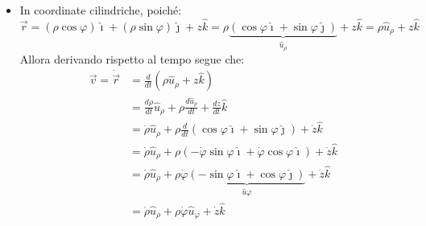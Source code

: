 \documentclass[11pt, a4paper, openright]{book}
\theoremstyle{plain}
\theoremstyle{definition}
\begin{document}
\begin{itemize}
\begin{itemize}
        \item Derivando la componente $\hat{\imath}$:
        \begin{align}
            \frac{d}{dt}(r\sin\theta\cos\varphi) = \dot{r}\sin\theta\cos\varphi + r\dot{\theta}\cos\theta\cos\varphi - r\dot{\varphi}\sin\theta\sin\varphi
        \end{align}
        \item Derivando la componente $\hat{\jmath}$:
        \begin{align}
            \frac{d}{dt}(r\sin\theta\sin\varphi) = \dot{r}\sin\theta\sin\varphi + r\dot{\theta}\cos\theta\sin\varphi + r\dot{\varphi}\sin\theta\cos\varphi
        \end{align}
        \item Derivando la componente $\hat{k}$:
        \begin{align}
            \frac{d}{dt}(r\cos\theta) = \dot{r}\cos\theta - r\dot{\theta}\sin\theta
        \end{align}
    \end{itemize}
    Raccogliendo per le componenti segue che:
    \begin{align}
        \vec{v} & = \dot{r}(\sin\theta\cos\varphi + \sin\theta\sin\varphi + \cos\theta ) + \dot{\theta}(r\cos\theta\cos\varphi + r\cos\theta\sin\varphi - r\sin\theta) + \\
        &\quad \; + \dot{\varphi}(-r\sin\theta\sin\varphi + r\sin\theta\cos\varphi) \\
        & = \dot{r}\hat{u}_r + r\dot{\theta}\hat{u}_\theta + \dot{\varphi}(r\sin\theta)\hat{u}_\varphi
    \end{align}
    \item In coordinate cilindriche, poiché:
    \[
    \vec{r} = (\rho\cos\varphi)\hat{\imath} + (\rho\sin\varphi)\hat{\jmath} + z\hat{k} = \rho\underbrace{(\cos\varphi\hat{\imath} + \sin\varphi\hat{\jmath})}_{\hat{u}_\rho} + z\hat{k} = \rho\hat{u}_\rho + z\hat{k}
    \]
    Allora derivando rispetto al tempo segue che:
    \begin{align}
    \vec{v} = \dot{\vec{r}} & = \frac{d}{dt}(\rho\hat{u}_\rho + z\hat{k}) \\
    & = \frac{d\rho}{dt}\hat{u}_\rho + \rho\frac{d\hat{u}_\rho}{dt} + \frac{dz}{dt}\hat{k} \\
    & = \dot{\rho}\hat{u}_\rho + \rho\frac{d}{dt}(\cos\varphi \hat{\imath} + \sin\varphi \hat{\jmath}) + \dot{z}\hat{k} \\
    & = \dot{\rho}\hat{u}_\rho + \rho(-\dot{\varphi}\sin\varphi\hat{\imath} + \dot{\varphi}\cos\varphi\hat{\imath}) + \dot{z}\hat{k} \\
    & = \dot{\rho}\hat{u}_\rho + \rho\dot{\varphi}\underbrace{(-\sin\varphi\hat{\imath} + \cos\varphi\hat{\jmath})}_{\hat{u}\varphi} + \dot{z}\hat{k} \\ 
    & = \dot{\rho}\hat{u}_\rho + \rho\dot{\varphi}\hat{u}_\varphi + \dot{z}\hat{k}
    \end{align}
\end{itemize}
\end{document}
